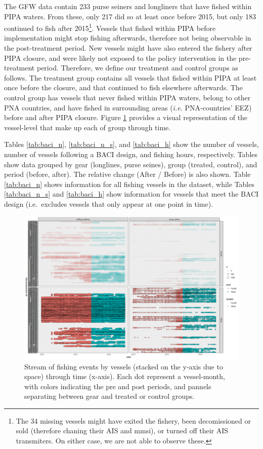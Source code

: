 \documentclass[]{article}
\let\rmarkdownfootnote\footnote%
\def\footnote{\protect\rmarkdownfootnote}
\begin{document}
The GFW data contain 233 purse seiners and longliners that have fished
within PIPA waters. From these, only 217 did so at least once before
2015, but only 183 continued to fish after 2015\footnote{The 34 missing
  vessels might have exited the fishery, been decomissioned or sold
  (therefore chaning their AIS and mmsi), or turned off their AIS
  transmiters. On either case, we are not able to observe these.}.
Vessels that fished within PIPA before implementation might stop fishing
afterwards, therefore not being observable in the post-treatment period.
New vessels might have also entered the fishery after PIPA closure, and
were likely not exposed to the policy intervention in the pre-treatment
period. Therefore, we define our treatment and control groups as
follows. The treatment group contains all vessels that fished within
PIPA at least once before the closure, and that continued to fish
elsewhere afterwards. The control group has vessels that never fished
within PIPA waters, belong to other PNA countries, and have fished in
surrounding areas (\emph{i.e.} PNA-countries' EEZ) before and after PIPA
closure. Figure \ref{fig:baci_strict} provides a visual representation
of the vessel-level that make up each of group through time.

Tables \ref{tab:baci_n}, \ref{tab:baci_n_s}, and \ref{tab:baci_h} show
the number of vessels, number of vessels following a BACI design, and
fishing hours, respectively. Tables show data grouped by gear
(longlines, purse seines), group (treated, control), and period (before,
after). The relative change (After / Before) is also shown. Table
\ref{tab:baci_n} shows information for all fishing vessels in the
dataset, while Tables \ref{tab:baci_n_s} and \ref{tab:baci_h} show
information for vessels that meet the BACI design (i.e.~excludes vessels
that only appear at one point in time).

\begin{figure}
\centering
\includegraphics{../img/BACI_strict_gear.png}
\caption{\label{fig:baci_strict}Stream of fishing events by vessels
(stacked on the y-axis due to space) through time (x-axis). Each dot
represent a vessel-month, with colors indicating the pre and post
periods, and pannels separating between gear and treated or control
groups.}
\end{figure}
\end{document}
